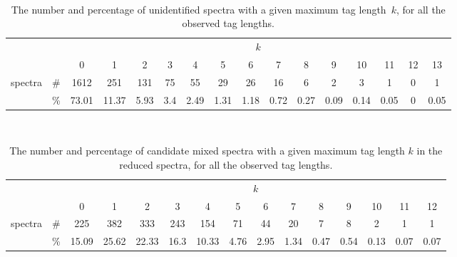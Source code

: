 \documentclass{article}
\begin{document}
\begin{table}[h]
\vspace{3mm}\
{\centering
\begin{center}
\begin{tabular}{|c|c|
c|c|c|c|c|c|c|c|c|c|c|c|c|c|}
  \hline
  \multicolumn{2}{|c|}{} & \multicolumn{ 14}{|c|}{$k$} \\
  \cline{3-16}
  \multicolumn{2}{|c|}{} 
 & 0 & 1 & 2 & 3 & 4 & 5 & 6 & 7 & 8 & 9 & 10 & 11 & 12 & 13\\
  \hline
  \multirow{2}{*}{spectra} & \#
 & 1612 & 251 & 131 & 75 & 55 & 29 & 26 & 16 & 6 & 2 & 3 & 1 & 0 & 1\\
   & \%
 & 73.01 & 11.37 & 5.93 & 3.4 & 2.49 & 1.31 & 1.18 & 0.72 & 0.27 & 0.09 & 0.14 & 0.05 & 0 & 0.05\\
  \hline
\end{tabular}
\end{center}
\par}
\centering
\caption{The number and percentage of unidentified spectra with a given maximum tag length~$k$, for all the observed tag lengths.}
\vspace{3mm}
\label{table:unident-tags}
\end{table}
\begin{table}[h]
\vspace{3mm}\
{\centering
\begin{center}
\begin{tabular}{|c|c|
c|c|c|c|c|c|c|c|c|c|c|c|c|}
  \hline
  \multicolumn{2}{|c|}{} & \multicolumn{ 13}{|c|}{$k$} \\
  \cline{3-15}
  \multicolumn{2}{|c|}{} 
 & 0 & 1 & 2 & 3 & 4 & 5 & 6 & 7 & 8 & 9 & 10 & 11 & 12\\
  \hline
  \multirow{2}{*}{spectra} & \#
 & 225 & 382 & 333 & 243 & 154 & 71 & 44 & 20 & 7 & 8 & 2 & 1 & 1\\
   & \%
 & 15.09 & 25.62 & 22.33 & 16.3 & 10.33 & 4.76 & 2.95 & 1.34 & 0.47 & 0.54 & 0.13 & 0.07 & 0.07\\
  \hline
\end{tabular}
\end{center}
\par}
\centering
\caption{The number and percentage of candidate mixed spectra with a given maximum tag length $k$ in the reduced spectra, for all the observed tag lengths.}
\vspace{3mm}
\label{table:mixed-tags}
\end{table}
\end{document}

